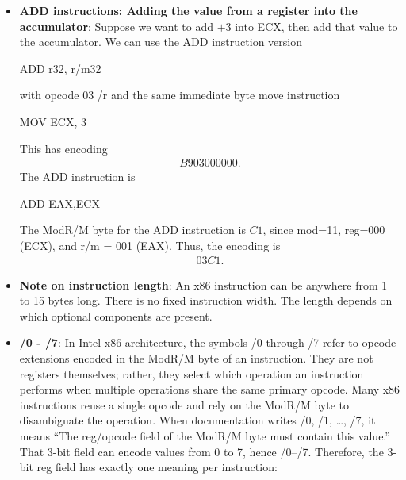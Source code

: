 \documentclass{report}
\begin{document}
\begin{itemize}
        \item \textbf{ADD instructions: Adding the value from a register into the accumulator}: Suppose we want to add $+3$ into ECX, then add that value to the accumulator. We can use the ADD instruction version
            \bigbreak \noindent 
            \begin{cppcode}
            ADD    r32, r/m32
            \end{cppcode}
            \bigbreak \noindent 
            with opcode 03 /r and the same immediate byte move instruction
            \bigbreak \noindent 
            \begin{cppcode}
            MOV    ECX, 3 
            \end{cppcode}
            \bigbreak \noindent 
            This has encoding 
            \begin{align*}
                B903000000
            .\end{align*}
            The ADD instruction is 
            \bigbreak \noindent 
            \begin{cppcode}
            ADD    EAX,ECX
            \end{cppcode}
            The ModR/M byte for the ADD instruction is $C1$, since mod=11, reg=000 (ECX), and r/m = 001  (EAX).  Thus, the encoding is
            \begin{align*}
                03C1
            .\end{align*}
        \item \textbf{Note on instruction length}: An x86 instruction can be anywhere from 1 to 15 bytes long. There is no fixed instruction width. The length depends on which optional components are present.
        \item \textbf{/0 - /7}: In Intel x86 architecture, the symbols /0 through /7 refer to opcode extensions encoded in the ModR/M byte of an instruction. They are not registers themselves; rather, they select which operation an instruction performs when multiple operations share the same primary opcode. 
            \bigbreak \noindent 
            Many x86 instructions reuse a single opcode and rely on the ModR/M byte to disambiguate the operation. When documentation writes /0, /1, …, /7, it means “The reg/opcode field of the ModR/M byte must contain this value.” That 3-bit field can encode values from 0 to 7, hence /0–/7.
            \bigbreak \noindent 
            Therefore, the 3-bit reg field has exactly one meaning per instruction:
            \begin{itemize}

\end{itemize}
\end{itemize}
\end{document}
